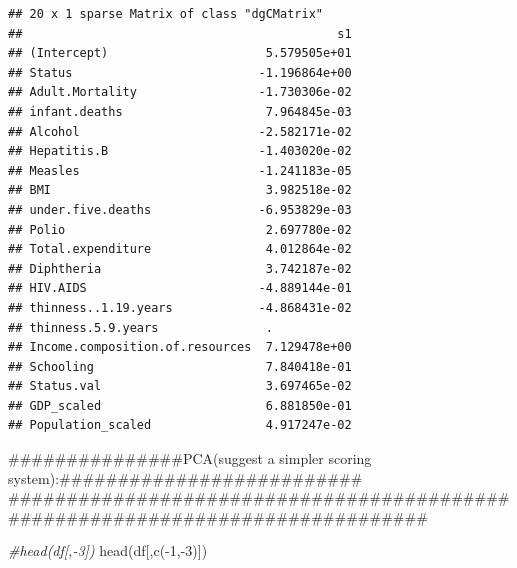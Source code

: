 \documentclass[
]{article}
\newenvironment{Shaded}{\begin{snugshade}}{\end{snugshade}}
\newcommand{\CommentTok}[1]{\textcolor[rgb]{0.56,0.35,0.01}{\textit{#1}}}
\newcommand{\DecValTok}[1]{\textcolor[rgb]{0.00,0.00,0.81}{#1}}
\newcommand{\FunctionTok}[1]{\textcolor[rgb]{0.00,0.00,0.00}{#1}}
\newcommand{\NormalTok}[1]{#1}
\newcommand{\SpecialCharTok}[1]{\textcolor[rgb]{0.00,0.00,0.00}{#1}}
\begin{document}
\begin{verbatim}
## 20 x 1 sparse Matrix of class "dgCMatrix"
##                                            s1
## (Intercept)                      5.579505e+01
## Status                          -1.196864e+00
## Adult.Mortality                 -1.730306e-02
## infant.deaths                    7.964845e-03
## Alcohol                         -2.582171e-02
## Hepatitis.B                     -1.403020e-02
## Measles                         -1.241183e-05
## BMI                              3.982518e-02
## under.five.deaths               -6.953829e-03
## Polio                            2.697780e-02
## Total.expenditure                4.012864e-02
## Diphtheria                       3.742187e-02
## HIV.AIDS                        -4.889144e-01
## thinness..1.19.years            -4.868431e-02
## thinness.5.9.years               .           
## Income.composition.of.resources  7.129478e+00
## Schooling                        7.840418e-01
## Status.val                       3.697465e-02
## GDP_scaled                       6.881850e-01
## Population_scaled                4.917247e-02
\end{verbatim}

\#\#\#\#\#\#\#\#\#\#\#\#\#\#\#PCA(suggest a simpler scoring
system):\#\#\#\#\#\#\#\#\#\#\#\#\#\#\#\#\#\#\#\#\#\#\#\#\#\#
\#\#\#\#\#\#\#\#\#\#\#\#\#\#\#\#\#\#\#\#\#\#\#\#\#\#\#\#\#\#\#\#\#\#\#\#\#\#\#\#\#\#\#\#\#\#\#\#\#\#\#\#\#\#\#\#\#\#\#\#\#\#\#\#\#\#\#\#\#\#\#\#\#\#\#\#\#\#\#

\begin{Shaded}
\begin{Highlighting}[]
\CommentTok{\#head(df[,{-}3])}
\FunctionTok{head}\NormalTok{(df[,}\FunctionTok{c}\NormalTok{(}\SpecialCharTok{{-}}\DecValTok{1}\NormalTok{,}\SpecialCharTok{{-}}\DecValTok{3}\NormalTok{)])}
\end{Highlighting}
\end{Shaded}
\end{document}
